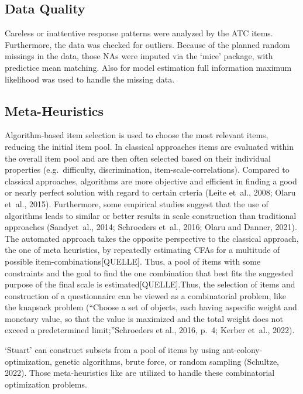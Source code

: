 \documentclass[
  12pt,
  a4paper,
  twoside]{article}
\begin{document}
\subsection{Data Quality}\label{data-quality}

Careless or inattentive response patterns were analyzed by the ATC items. Furthermore, the data was checked for outliers. Because of the planned random missings in the data, those NAs were imputed via the `mice' package, with predictice mean matching. Also for model estimation full information maximum likelihood was used to handle the missing data.

\subsection{Meta-Heuristics}\label{meta-heuristics}

Algorithm-based item selection is used to choose the most relevant items, reducing the initial item pool. In classical approaches items are evaluated within the overall item pool and are then often selected based on their individual properties (e.g.~difficulty, discrimination, item-scale-correlations).
Compared to classical approaches, algorithms are more objective and efficient in finding a good or nearly perfect solution with regard to certain crteria (Leite et~al., 2008; Olaru et~al., 2015). Furthermore, some empirical studies suggest that the use of algorithms leads to similar or better results in scale construction than traditional approaches (Sandyet~al., 2014; Schroeders et~al., 2016; Olaru and Danner, 2021). The automated approach takes the opposite perspective to the classical approach, the one of meta heuristics, by repeatedly estimating CFAs for a multitude of possible item-combinations{[}QUELLE{]}. Thus, a pool of items with some constraints and the goal to find the one combination that best fits the suggested purpose of the final scale is estimated{[}QUELLE{]}.Thus, the selection of items and construction of a questionnaire can be viewed as a combinatorial problem, like the knapsack problem (``Choose a set of objects, each having aspecific weight and monetary value, so that the value is maximized and the total weight does not exceed a predetermined limit;''Schroeders et al., 2016, p.~4; Kerber et~al., 2022).

`Stuart' can construct subsets from a pool of items by using ant-colony- optimization, genetic algorithms, brute force, or random sampling (Schultze, 2022). Those meta-heuristics like are utilized to handle these combinatorial optimization problems.
\end{document}

